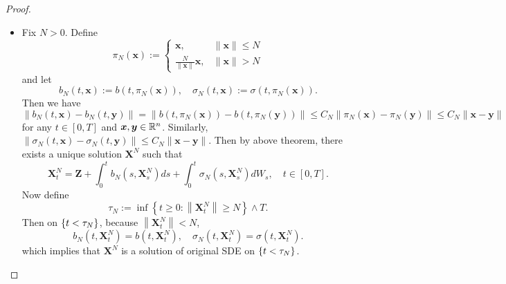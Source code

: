 \begin{proof}
    \begin{itemize}
        \item Fix $N > 0$. Define
        \begin{equation*}
            \pi_N(\bm{x}):= \begin{cases}\bm{x}, & \|\bm{x}\| \leq N \\ \frac{N}{\|\bm{x}\|} \bm{x}, & \|\bm{x}\|>N\end{cases}
        \end{equation*}
        and let
        \begin{equation*}
            b_N(t, \bm{x}):=b\left(t, \pi_N(\bm{x})\right), \quad \sigma_N(t, \bm{x}):=\sigma\left(t, \pi_N(\bm{x})\right) .
        \end{equation*}
        Then we have
        \begin{equation*}
            \left\|b_N(t, \bm{x})-b_N(t, \bm{y})\right\|=\left\|b\left(t, \pi_N(\bm{x})\right)-b\left(t, \pi_N(\bm{y})\right)\right\| \leq C_N\left\|\pi_N(\bm{x})-\pi_N(\bm{y})\right\| \leq C_N\|\bm{x}-\bm{y}\|
        \end{equation*}
        for any $t \in [0,T]$ and $\bm{x},\bm{y} \in \mathbb{R}^n$. Similarly, $\left\|\sigma_N(t, \bm{x})-\sigma_N(t, \bm{y})\right\| \leq C_N\|\bm{x}-\bm{y}\|$. Then by above theorem, there exists a unique solution $\bm{X}^N$ such that
        \begin{equation*}
            \bm{X}_t^N=\bm{Z}+\int_0^t b_N\left(s, \bm{X}_s^N\right) d s+\int_0^t \sigma_N\left(s, \bm{X}_s^N\right) d W_s, \quad t \in[0, T].
        \end{equation*}
        Now define
        \begin{equation*}
            \tau_N:=\inf \left\{t \geq 0:\left\|\bm{X}_t^N\right\| \geq N\right\} \wedge T .
        \end{equation*}
        Then on $\left\{t < \tau_N\right\}$, because $\left\|\bm{X}_t^N\right\| < N$,
        \begin{equation*}
            b_N\left(t, \bm{X}_t^N\right)=b\left(t, \bm{X}_t^N\right), \quad \sigma_N\left(t, \bm{X}_t^N\right)=\sigma\left(t, \bm{X}_t^N\right) .
        \end{equation*}
        which implies that $\bm{X}^N$ is a solution of original SDE on $\left\{t < \tau_N\right\}$.


\end{itemize}
\end{proof}
